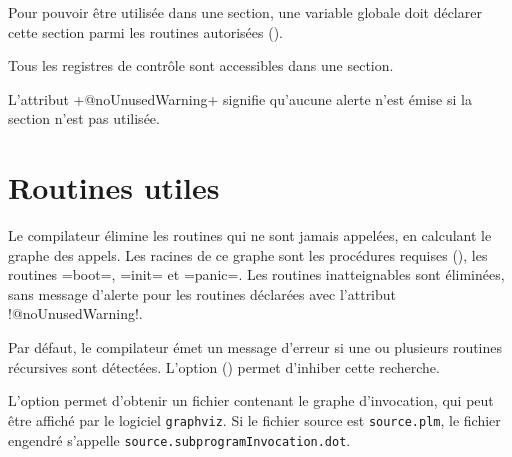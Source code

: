 
Pour pouvoir être utilisée dans une section, une variable globale doit déclarer cette section parmi les routines autorisées ().




Tous les registres de contrôle sont accessibles dans une section.








L'attribut \plm+@noUnusedWarning+ signifie qu'aucune alerte n'est émise si la section n'est pas utilisée.






























\section{Routines utiles}

Le compilateur élimine les routines qui ne sont jamais appelées, en calculant le graphe des appels. Les racines de ce graphe sont les procédures requises (), les routines \plm=boot=, \plm=init= et \plm=panic=. Les routines inatteignables sont éliminées, sans message d'alerte pour les routines déclarées avec l'attribut \plm!@noUnusedWarning!.












Par défaut, le compilateur émet un message d'erreur si une ou plusieurs routines récursives sont détectées. L'option  () permet d'inhiber cette recherche.

L'option  permet d'obtenir un fichier contenant le graphe d'invocation, qui peut être affiché par le logiciel \texttt{graphviz}. Si le fichier source est \texttt{source.plm}, le fichier engendré s'appelle \texttt{source.subprogramInvocation.dot}.

